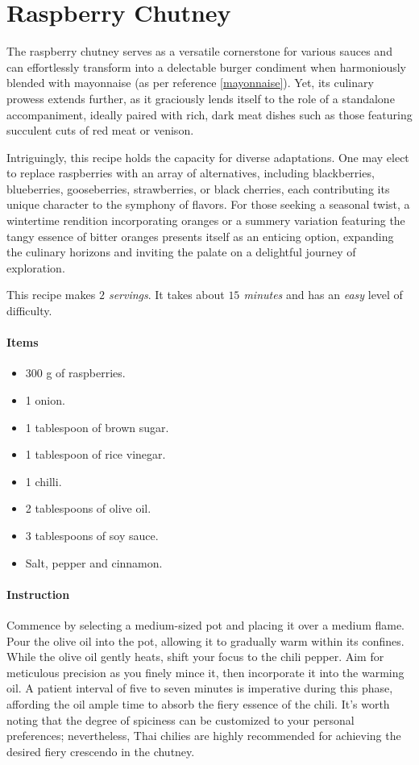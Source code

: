 \section{Raspberry Chutney}
\label{raspberrychuttney}
The raspberry chutney serves as a versatile cornerstone for various sauces and can effortlessly transform into a delectable burger condiment when harmoniously blended with mayonnaise (as per reference \ref{mayonnaise}). Yet, its culinary prowess extends further, as it graciously lends itself to the role of a standalone accompaniment, ideally paired with rich, dark meat dishes such as those featuring succulent cuts of red meat or venison.

Intriguingly, this recipe holds the capacity for diverse adaptations. One may elect to replace raspberries with an array of alternatives, including blackberries, blueberries, gooseberries, strawberries, or black cherries, each contributing its unique character to the symphony of flavors. For those seeking a seasonal twist, a wintertime rendition incorporating oranges or a summery variation featuring the tangy essence of bitter oranges presents itself as an enticing option, expanding the culinary horizons and inviting the palate on a delightful journey of exploration.

This recipe makes \emph{$2$ servings}. It takes about \emph{$15$ minutes} and has an \emph{easy} level of difficulty. 

\paragraph{Items}
\begin{itemize}[noitemsep]
    \item[\ding{182}] $300$ g of raspberries.
    \item[\ding{183}] 1 onion.
    \item[\ding{184}] 1 tablespoon of brown sugar.
    \item[\ding{185}] 1 tablespoon of rice vinegar.
    \item[\ding{186}] 1 chilli.
    \item[\ding{187}] 2 tablespoons of olive oil.
    \item[\ding{188}] 3 tablespoons of soy sauce.
    \item[\ding{189}] Salt, pepper and cinnamon.
\end{itemize}

\paragraph{Instruction}
Commence by selecting a medium-sized pot and placing it over a medium flame. Pour the olive oil into the pot, allowing it to gradually warm within its confines. While the olive oil gently heats, shift your focus to the chili pepper. Aim for meticulous precision as you finely mince it, then incorporate it into the warming oil. A patient interval of five to seven minutes is imperative during this phase, affording the oil ample time to absorb the fiery essence of the chili. It's worth noting that the degree of spiciness can be customized to your personal preferences; nevertheless, Thai chilies are highly recommended for achieving the desired fiery crescendo in the chutney.

